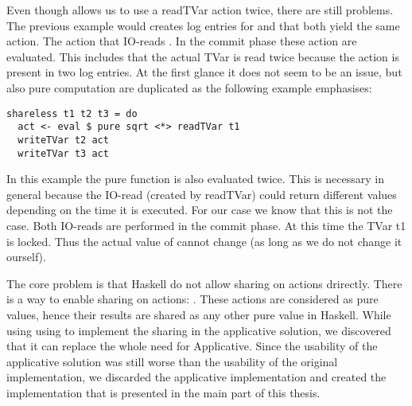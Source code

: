 Even though  allows us to use a readTVar action twice, there are still problems. The previous example
would creates log entries for  and  that both yield the same  action. The  
action that IO-reads . In the commit phase these action are evaluated. This includes that the actual 
TVar is read twice because the action is present in two log entries. At the first glance it does not seem to
be an issue, but also pure computation are duplicated as the following example emphasises:
\begin{lstlisting}
shareless t1 t2 t3 = do 
  act <- eval $ pure sqrt <*> readTVar t1
  writeTVar t2 act
  writeTVar t3 act
\end{lstlisting}
In this example the pure function  is also evaluated twice. This is necessary in general because the 
IO-read (created by readTVar) could return different values depending on the time it is executed. For our case
we know that this is not the case. Both IO-reads are performed in the commit phase. At this time the TVar t1 is 
locked. Thus the actual value of  cannot change (as long as we do not change it ourself). 

The core problem is that Haskell do not allow sharing on  actions drirectly. There is a way to enable 
sharing on  actions: . These actions are considered as pure values, 
hence their results are shared as any other pure value in Haskell. While using using 
to implement the sharing in the applicative solution, we discovered that it can replace the whole need for 
Applicative. Since the usability of the applicative solution was still worse than the usability of the 
original implementation, we discarded the applicative implementation and created the implementation that
is presented in the main part of this thesis.


